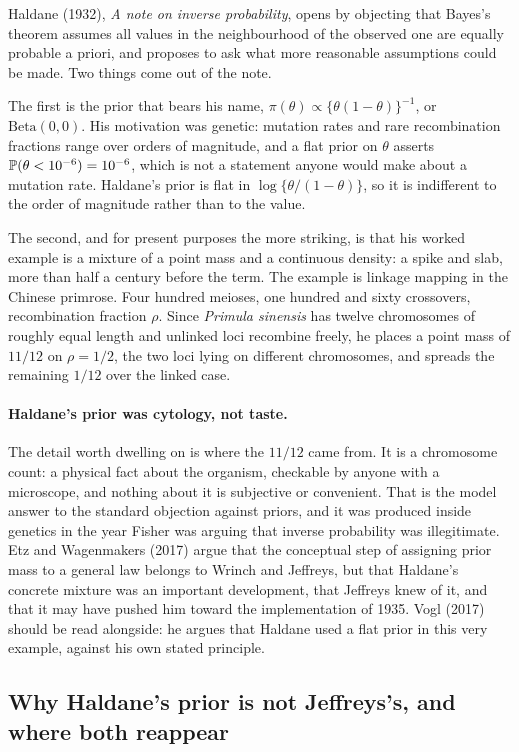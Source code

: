 Haldane (1932), \emph{A note on inverse probability}, opens by objecting that Bayes's theorem
assumes all values in the neighbourhood of the observed one are equally probable a priori, and
proposes to ask what more reasonable assumptions could be made. Two things come out of the note.

The first is the prior that bears his name, $\pi(\theta)\propto\{\theta(1-\theta)\}^{-1}$, or
$\text{Beta}(0,0)$. His motivation was genetic: mutation rates and rare recombination fractions
range over orders of magnitude, and a flat prior on $\theta$ asserts $\mathbb{P}(\theta<10^{-6})=10^{-6}$,
which is not a statement anyone would make about a mutation rate. Haldane's prior is flat in
$\log\{\theta/(1-\theta)\}$, so it is indifferent to the order of magnitude rather than to the
value.

The second, and for present purposes the more striking, is that his worked example is a mixture of
a point mass and a continuous density: a spike and slab, more than half a century before the term.
The example is linkage mapping in the Chinese primrose. Four hundred meioses, one hundred and sixty
crossovers, recombination fraction $\rho$. Since \emph{Primula sinensis} has twelve chromosomes of
roughly equal length and unlinked loci recombine freely, he places a point mass of $11/12$ on
$\rho=1/2$, the two loci lying on different chromosomes, and spreads the remaining $1/12$ over the
linked case.

\paragraph{Haldane's prior was cytology, not taste.} The detail worth dwelling on is where the
$11/12$ came from. It is a chromosome count: a physical fact about the organism, checkable by
anyone with a microscope, and nothing about it is subjective or convenient. That is the model
answer to the standard objection against priors, and it was produced inside genetics in the year
Fisher was arguing that inverse probability was illegitimate. Etz and Wagenmakers (2017) argue that
the conceptual step of assigning prior mass to a general law belongs to Wrinch and Jeffreys, but
that Haldane's concrete mixture was an important development, that Jeffreys knew of it, and that it
may have pushed him toward the implementation of 1935. Vogl (2017) should be read alongside: he
argues that Haldane used a flat prior in this very example, against his own stated principle.

\subsection{Why Haldane's prior is not Jeffreys's, and where both reappear}

